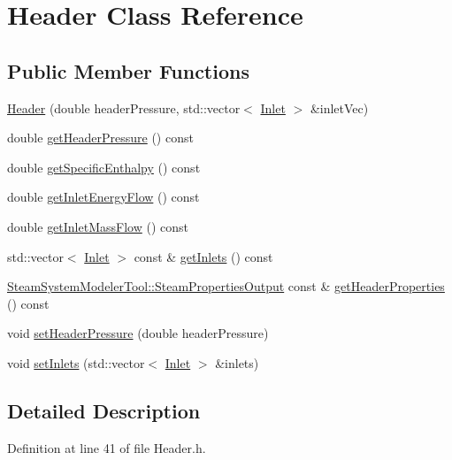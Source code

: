 \hypertarget{class_header}{}\section{Header Class Reference}
\label{class_header}
\subsection*{Public Member Functions}
\begin{DoxyCompactItemize}
\item 
\hyperlink{class_header_a59b836abde0be58bec65ebea1ac67a3b}{Header} (double header\+Pressure, std\+::vector$<$ \hyperlink{class_inlet}{Inlet} $>$ \&inlet\+Vec)
\item 
double \hyperlink{class_header_adc2e6daaf9f5e633c3db96ff3990f1f6}{get\+Header\+Pressure} () const
\item 
double \hyperlink{class_header_af913dbf132f8cb3af6e6b374813acd93}{get\+Specific\+Enthalpy} () const
\item 
double \hyperlink{class_header_a2a30ee96fa76bab1533cb9ceea0c8af3}{get\+Inlet\+Energy\+Flow} () const
\item 
double \hyperlink{class_header_ad572e6144481b9e9f65004aacebd701c}{get\+Inlet\+Mass\+Flow} () const
\item 
std\+::vector$<$ \hyperlink{class_inlet}{Inlet} $>$ const  \& \hyperlink{class_header_a625d7317488c88c949acd05c72a7c54a}{get\+Inlets} () const
\item 
\hyperlink{struct_steam_system_modeler_tool_1_1_steam_properties_output}{Steam\+System\+Modeler\+Tool\+::\+Steam\+Properties\+Output} const  \& \hyperlink{class_header_a0d27b0e1b3c16cc24b4ba6f64abb7cb0}{get\+Header\+Properties} () const
\item 
void \hyperlink{class_header_a3af0b7964b74287ce0c662b9a88556ed}{set\+Header\+Pressure} (double header\+Pressure)
\item 
void \hyperlink{class_header_ae69b6f894210a6cd340e92222f8bc343}{set\+Inlets} (std\+::vector$<$ \hyperlink{class_inlet}{Inlet} $>$ \&inlets)
\end{DoxyCompactItemize}


\subsection{Detailed Description}


Definition at line 41 of file Header.\+h.



